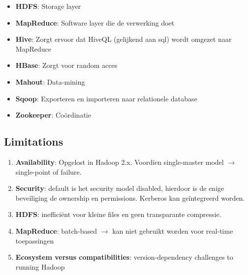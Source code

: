 \documentclass[a4paper,12pt]{article}
\begin{document}
\begin{itemize}
\item \textbf{HDFS}: Storage layer
\item \textbf{MapReduce}: Software layer die de verwerking doet
\item \textbf{Hive}: Zorgt ervoor dat HiveQL (gelijkend aan sql) wordt omgezet naar MapReduce
\item \textbf{HBase}: Zorgt voor random acces
\item \textbf{Mahout}: Data-mining
\item \textbf{Sqoop}: Exporteren en importeren naar relationele database
\item \textbf{Zookeeper}: Coördinatie
\end{itemize}

\subsection{Limitations}
\begin{enumerate}
\item \textbf{Availability}: Opgelost in Hadoop 2.x. Voordien single-master model $\rightarrow$ single-point of failure.
\item \textbf{Security}: default is het security model disabled, hierdoor is de enige beveiliging de ownership en permissions. Kerberos kan geïntegreerd worden.
\item \textbf{HDFS}: inefficiënt voor kleine files en geen transparante compressie.
\item \textbf{MapReduce}: batch-based $\rightarrow$ kan niet gebruikt worden voor real-time toepassingen
\item \textbf{Ecosystem versus compatibilities}: version-dependency challenges to running Hadoop
\end{enumerate}
\end{document}

